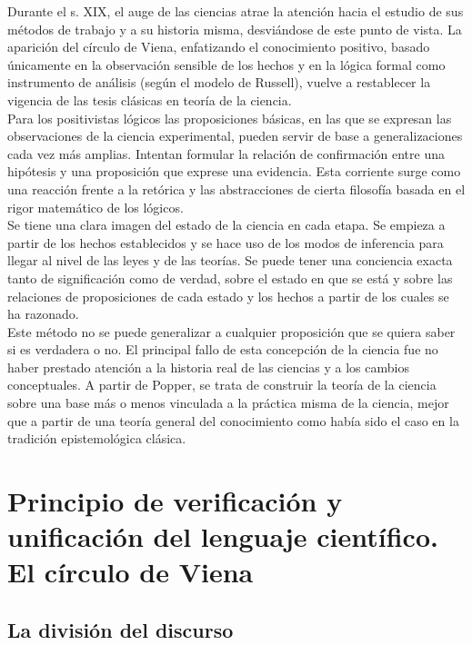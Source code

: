 \documentclass[a4paper, 11pt, twocolumn, spanish]{article}
\begin{document}
Durante el s. XIX, el auge de las ciencias atrae la atención hacia el
estudio de sus métodos de trabajo y a su historia misma, desviándose
de este punto de vista. La aparición del círculo de Viena, enfatizando
el conocimiento positivo, basado únicamente en la observación sensible
de los hechos y en la lógica formal como instrumento de análisis
(según el modelo de Russell), vuelve a restablecer la vigencia de las
tesis clásicas en teoría de la ciencia.\\

Para los positivistas lógicos las proposiciones básicas, en las que se
expresan las observaciones de la ciencia experimental, pueden servir
de base a generalizaciones cada vez más amplias.  Intentan formular la
relación de confirmación entre una hipótesis y una proposición que
exprese una evidencia. Esta corriente surge como una reacción frente a
la retórica y las abstracciones de cierta filosofía basada en el rigor
matemático de los lógicos.\\
Se tiene una clara imagen del estado de la ciencia en cada etapa. Se
empieza a partir de los hechos establecidos y se hace uso de los modos
de inferencia para llegar al nivel de las leyes y de las teorías. Se
puede tener una conciencia exacta tanto de significación como de
verdad, sobre el estado en que se está y sobre las relaciones de
proposiciones de cada estado y los hechos a partir de los cuales se ha
razonado.\\

Este método no se puede generalizar a cualquier proposición que se
quiera saber si es verdadera o no. El principal fallo de esta
concepción de la ciencia fue no haber prestado atención a la historia
real de las ciencias y a los cambios conceptuales. A partir de Popper,
se trata de construir la teoría de la ciencia sobre una base más o
menos vinculada a la práctica misma de la ciencia, mejor que a partir
de una teoría general del conocimiento como había sido el caso en la
tradición epistemológica clásica.

\section{Principio de verificación y unificación del lenguaje científico. El círculo de Viena}
\label{sec:org6694c88}
\subsection{La división del discurso}
\label{sec:orga050fa8}
\end{document}
